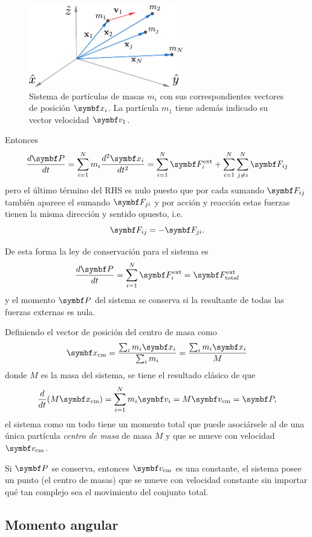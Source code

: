 \documentclass[10pt,oneside]{CBFT_book}
\begin{document}
\begin{figure}[hbt]
	\begin{center}
	\includegraphics[width=0.6\textwidth]{images/fig_mc_leyes_cons.pdf}
	\end{center}
	\caption{Sistema de partículas de masas $m_i$ con sus correspondientes vectores de
	posición $\vb{x}_i$. La partícula $m_1$ tiene además indicado su vector velocidad $\vb{v}_1$.}
	\label{fig_mc_leyes_cons}
\end{figure} 

Entonces 
\[
	\dtot{\vb{P}}{t} = \Sum{i=1}{N} m_i \dtot[2]{\vb{x}_i}{t} = \Sum{i=1}{N} \vb{F}_i^\text{ext} + 
	\Sum{i=1}{N} \Sum{ j \neq i }{N} \vb{F}_{ij}
\]
pero el último término del RHS es nulo puesto que por cada sumando $ \vb{F}_{ij} $ también aparece el sumando 
$ \vb{F}_{ji} $ y por acción y reacción estas fuerzas tienen la misma dirección y sentido opuesto, i.e.
\[
	\vb{F}_{ij} = - \vb{F}_{ji}.
\]

De esta forma la ley de conservación para el sistema es 
\[
	\dtot{\vb{P}}{t} = \Sum{i=1}{N} \vb{F}_i^\text{ext} = \vb{F}^\text{ext}_\text{total}
\]
y el momento $ \vb{P} $ del sistema se conserva si la resultante de todas las fuerzas externas es nula. 

Definiendo el vector de posición del centro de masa como 
\[
	\vb{x}_\text{cm} = \frac{\sum_i m_i \vb{x}_i }{\sum_i m_i} = \frac{\sum_i m_i \vb{x}_i }{M}
\]
donde $ M $ es la masa del sistema, se tiene el resultado clásico de que
\[
	\dtot{}{t}( M \vb{x}_\text{cm} ) = \Sum{i=1}{N} m_i \vb{v}_i = M \vb{v}_\text{cm} = \vb{P},
\]
el sistema como un todo tiene un momento total que puede asociársele al de una única partícula {\it centro de masa} de 
masa $M$ y que se mueve con velocidad $ \vb{v}_\text{cm} $.

Si $\vb{P}$ se conserva, entonces $ \vb{v}_\text{cm} $ es una constante, el sistema posee un punto (el centro de masas) 
que se mueve con velocidad constante sin importar qué tan complejo sea el movimiento del conjunto total.


\subsection{Momento angular}
\end{document}

